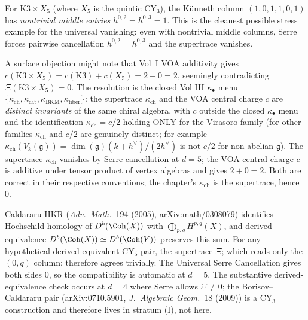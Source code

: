 \begin{remark}
\label{rem:cy-strat-d5-kunneth-kappa-spectrum}
For $\mathrm{K3} \times X_5$ (where $X_5$ is the quintic CY$_3$), the
K\"unneth column $(1, 0, 1, 1, 0, 1)$ has \emph{nontrivial middle
entries} $h^{0, 2} = h^{0, 3} = 1$. This is the cleanest possible
stress example for the universal vanishing: even with nontrivial middle
columns, Serre forces pairwise cancellation $h^{0, 2} = h^{0, 3}$ and
the supertrace vanishes.

A surface objection might note that Vol~I VOA additivity gives
$c(\mathrm{K3} \times X_5) = c(\mathrm{K3}) + c(X_5) = 2 + 0 = 2$,
seemingly contradicting $\Xi(\mathrm{K3} \times X_5) = 0$. The resolution
is the closed Vol III $\kappa_\bullet$ menu
$\{\kappa_{\mathrm{ch}}, \kappa_{\mathrm{cat}}, \kappa_{\mathrm{BKM}},
\kappa_{\mathrm{fiber}}\}$: the supertrace
$\kappa_{\mathrm{ch}}$ and the VOA central charge $c$ are
\emph{distinct invariants} of the same chiral algebra, with $c$ outside
the closed $\kappa_\bullet$ menu and the identification $\kappa_{\mathrm{ch}} = c/2$
holding ONLY for the Virasoro family (for other families $\kappa_{\mathrm{ch}}$ and
$c/2$ are genuinely distinct; for example $\kappa_{\mathrm{ch}}(V_k(\mathfrak{g})) = \dim(\mathfrak{g})(k+h^\vee)/(2h^\vee)$ is not $c/2$ for non-abelian $\mathfrak{g}$). The supertrace $\kappa_{\mathrm{ch}}$
vanishes by Serre cancellation at $d = 5$; the VOA central charge $c$
is additive under tensor product of vertex algebras and gives
$2 + 0 = 2$. Both are correct in their respective conventions; the
chapter's $\kappa_{\mathrm{ch}}$ is the supertrace, hence $0$.
\end{remark}

\begin{remark}[Derived-equivalence compatibility at \texorpdfstring{$d = 5$}{d = 5}]
\label{rem:cy-strat-d5-derived-equivalence}
Caldararu HKR (\emph{Adv.~Math.}~194 (2005), arXiv:math/0308079)
identifies Hochschild homology of $D^b(\Coh(X))$ with
$\bigoplus_{p, q} H^{p, q}(X)$, and derived equivalence
$D^b(\Coh(X)) \simeq D^b(\Coh(Y))$ preserves this sum. For any hypothetical
derived-equivalent CY$_5$ pair, the supertrace $\Xi$; which reads only
the $(0, q)$ column; therefore agrees trivially. The Universal Serre
Cancellation gives both sides $0$, so the compatibility is automatic
at $d = 5$. The substantive derived-equivalence check occurs at $d = 4$
where Serre allows $\Xi \neq 0$; the Borisov--Caldararu pair
(arXiv:0710.5901, \emph{J.~Algebraic Geom.}~18 (2009)) is a CY$_3$
construction and therefore lives in stratum (I), not here.
\end{remark}

